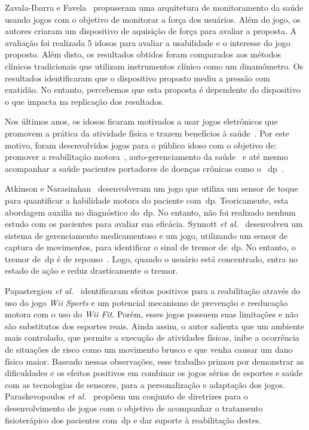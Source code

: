 Zavala-Ibarra e Favela~\cite{ambientgameolder2012} propuseram uma arquitetura de monitoramento da saúde usando jogos com o objetivo de monitorar a força dos usuários. Além do jogo, os autores criaram um dispositivo de aquisição de força para avaliar a proposta. A avaliação foi realizada 5 idosos para avaliar a usabilidade e o interesse do jogo proposto. Além disto, os resultados obtidos foram comparados aos métodos clínicos tradicionais que utilizam instrumentos clínico como um dinamômetro. Os resultados identificaram que o dispositivo proposto mediu a pressão com exatidão. No entanto, percebemos que esta proposta é dependente do dispositivo o que impacta na replicação dos resultados. 

Nos últimos anos, os idosos ficaram motivados a usar jogos eletrônicos que promovem a prática da atividade física e trazem benefícios à saúde~\cite{physicalactivityolder2014}. Por este motivo, foram desenvolvidos jogos para o público idoso com o objetivo de: promover a reabilitação motora~\cite{cloudrehabi2014}, auto-gerenciamento da saúde~\cite{seriousgameolder2015} e até mesmo acompanhar a saúde pacientes portadores de doenças crônicas como o ~\ac{dp}~\cite{synnott_wiipd_2012,sacbespoke2014}. 

Atkinson e Narasimhan~\cite{atkinson2010} desenvolveram um jogo que utiliza um sensor de toque para quantificar a habilidade motora do paciente com~\ac{dp}. Teoricamente, esta abordagem auxilia no diagnóstico do~\ac{dp}. No entanto, não foi realizado nenhum estudo com os pacientes para avaliar sua eficácia. Synnott \textit{et al.}~\cite{synnott_wiipd_2012} desenvolveu um sistema de gerenciamento medicamentoso e um jogo, utilizando um sensor de captura de movimentos, para identificar o sinal de tremor de~\ac{dp}. No entanto, o tremor de~\ac{dp} é de repouso~\cite{national2006parkinson}. Logo, quando o usuário está concentrado, entra no estado de ação e reduz drasticamente o tremor.

Papastergiou \textit{et al.}~\cite{Papastergiou:2009:EPC:1570538.1570707} identificaram efeitos positivos para a reabilitação através do uso do jogo \textit{Wii Sports} e um potencial mecanismo de prevenção e reeducação motora com o uso do \textit{Wii Fit}. Porém, esses jogos possuem suas limitações e não são substitutos dos esportes reais. Ainda assim, o autor salienta que um ambiente mais controlado, que permite a execução de atividades físicas, inibe a ocorrência de situações de risco como um movimento brusco e que venha causar um dano físico maior. Baseado nessas observações, esse trabalho primou por demonstrar as dificuldades e os efeitos positivos em combinar os jogos sérios de esportes e saúde com as tecnologias de sensores, para a personalização e adaptação dos jogos. Paraskevopoulos \textit{et al.}~\cite{sacbespoke2014} propõem um conjunto de diretrizes para o desenvolvimento de jogos com o objetivo de acompanhar o tratamento fisioterápico dos pacientes com~\ac{dp} e dar suporte à reabilitação destes.

